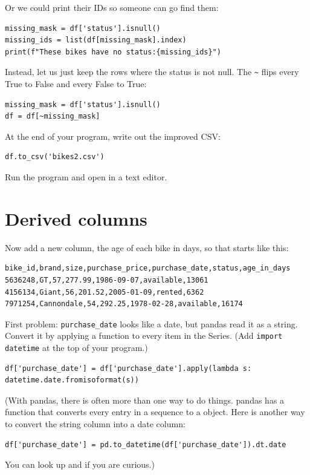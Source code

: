 Or we could print their IDs so someone can go find them:

\begin{verbatim}
missing_mask = df['status'].isnull()
missing_ids = list(df[missing_mask].index)
print(f"These bikes have no status:{missing_ids}")
\end{verbatim}

Instead, let us just keep the rows where the status is not null. The
\texttt{\textasciitilde} flips every True to False and every False to True:
\begin{verbatim}
missing_mask = df['status'].isnull()
df = df[~missing_mask]
\end{verbatim}

At the end of your program, write out the improved CSV:

\begin{verbatim}
df.to_csv('bikes2.csv')
\end{verbatim}

Run the program and open  in a text editor.

\section{Derived columns}

Now add a new column, the age of each bike in days, so that
 starts like this:
\begin{verbatim}
bike_id,brand,size,purchase_price,purchase_date,status,age_in_days
5636248,GT,57,277.99,1986-09-07,available,13061
4156134,Giant,56,201.52,2005-01-09,rented,6362
7971254,Cannondale,54,292.25,1978-02-28,available,16174
\end{verbatim}

First problem: \texttt{purchase\_date} looks like a date, but pandas read
it as a string. Convert it by applying a function to every item in the
Series. (Add \texttt{import datetime} at the top of your
program.)
\begin{verbatim}
df['purchase_date'] = df['purchase_date'].apply(lambda s: datetime.date.fromisoformat(s))
\end{verbatim}

(With pandas, there is often more than one way to do things.  pandas
has a  function that converts every entry in
a sequence to a  object. Here is another way to
convert the string column into a date column:
\begin{verbatim}
df['purchase_date'] = pd.to_datetime(df['purchase_date']).dt.date
\end{verbatim}
You can look up  and  if you are curious.)

